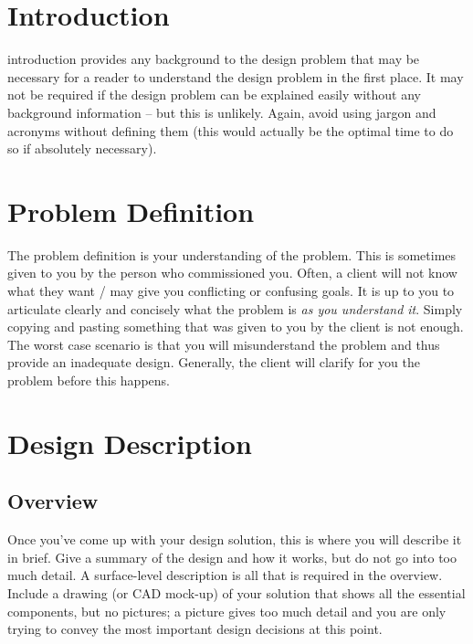 \documentclass[journal]{IEEEtran}
\begin{document}
\section{Introduction}

% 
 introduction provides any background to the design problem that may be necessary for 
a reader to understand the design problem in the first place. It may not be required if the design problem
can be explained easily without any background information -- but this is unlikely. Again, avoid using 
jargon and acronyms without defining them (this would actually be the optimal time to do so if 
absolutely necessary). 

\section{Problem Definition}
The problem definition is your understanding of the problem. This is sometimes given to you by the person
who commissioned you. Often, a client will not know what they want / may give you conflicting or confusing 
goals. It is up to you to articulate clearly and concisely what the problem is \textit{as you understand it}.
Simply copying and pasting something that was given to you by the client is not enough. The worst case 
scenario is that you will misunderstand the problem and thus provide an inadequate design. Generally, 
the client will clarify for you the problem before this happens. 

\section{Design Description}

\subsection{Overview}
Once you've come up with your design solution, this is where you will describe it in brief. Give a 
summary of the design and how it works, but do not go into too much detail. A surface-level description
is all that is required in the overview. Include a drawing (or CAD mock-up) of your solution that shows 
all the essential components, but no pictures; a picture gives too much detail and you are only trying 
to convey the most important design decisions at this point. 
\end{document}

